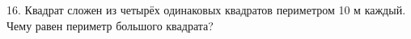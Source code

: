 16. Квадрат сложен из четырёх одинаковых квадратов периметром 10 м каждый. Чему равен периметр большого квадрата?\\
